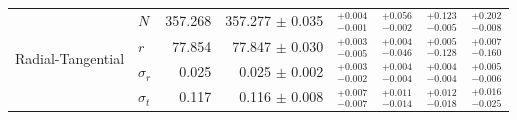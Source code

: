 \documentclass[11pt]{article}
\begin{document}
\begin{table}[ht]
\begin{tabular}{llrrrrrr}
\midrule
\multirow{4}{*}{Radial-Tangential} & $N$ & 357.268 & 357.277 $\pm$ 0.035 & $^{+0.004}_{-0.001}$ & $^{+0.056}_{-0.002}$ & $^{+0.123}_{-0.005}$ & $^{+0.202}_{-0.008}$ \\
 & $r$ & 77.854 & 77.847 $\pm$ 0.030 & $^{+0.003}_{-0.005}$ & $^{+0.004}_{-0.046}$ & $^{+0.005}_{-0.128}$ & $^{+0.007}_{-0.160}$ \\
 & $\sigma_r$ & 0.025 & 0.025 $\pm$ 0.002 & $^{+0.003}_{-0.002}$ & $^{+0.004}_{-0.004}$ & $^{+0.004}_{-0.004}$ & $^{+0.005}_{-0.006}$ \\
 & $\sigma_t$ & 0.117 & 0.116 $\pm$ 0.008 & $^{+0.007}_{-0.007}$ & $^{+0.011}_{-0.014}$ & $^{+0.012}_{-0.018}$ & $^{+0.016}_{-0.025}$ \\
\bottomrule
\end{tabular}
\label{tab:bs-1}
\end{table}
\end{document}
